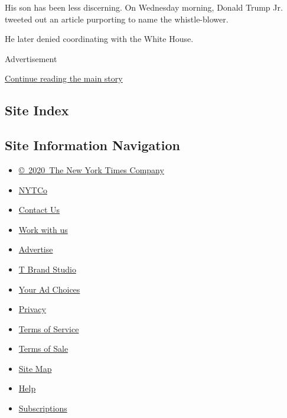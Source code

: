 His son has been less discerning. On Wednesday morning, Donald Trump Jr.
tweeted out an article purporting to name the whistle-blower.

He later denied coordinating with the White House.

Advertisement

\protect\hyperlink{after-bottom}{Continue reading the main story}

\hypertarget{site-index}{%
\subsection{Site Index}\label{site-index}}

\hypertarget{site-information-navigation}{%
\subsection{Site Information
Navigation}\label{site-information-navigation}}

\begin{itemize}
\tightlist
\item
  \href{https://help.nytimes.com/hc/en-us/articles/115014792127-Copyright-notice}{©~2020~The
  New York Times Company}
\end{itemize}

\begin{itemize}
\tightlist
\item
  \href{https://www.nytco.com/}{NYTCo}
\item
  \href{https://help.nytimes.com/hc/en-us/articles/115015385887-Contact-Us}{Contact
  Us}
\item
  \href{https://www.nytco.com/careers/}{Work with us}
\item
  \href{https://nytmediakit.com/}{Advertise}
\item
  \href{http://www.tbrandstudio.com/}{T Brand Studio}
\item
  \href{https://www.nytimes.com/privacy/cookie-policy\#how-do-i-manage-trackers}{Your
  Ad Choices}
\item
  \href{https://www.nytimes.com/privacy}{Privacy}
\item
  \href{https://help.nytimes.com/hc/en-us/articles/115014893428-Terms-of-service}{Terms
  of Service}
\item
  \href{https://help.nytimes.com/hc/en-us/articles/115014893968-Terms-of-sale}{Terms
  of Sale}
\item
  \href{https://spiderbites.nytimes.com}{Site Map}
\item
  \href{https://help.nytimes.com/hc/en-us}{Help}
\item
  \href{https://www.nytimes.com/subscription?campaignId=37WXW}{Subscriptions}
\end{itemize}
